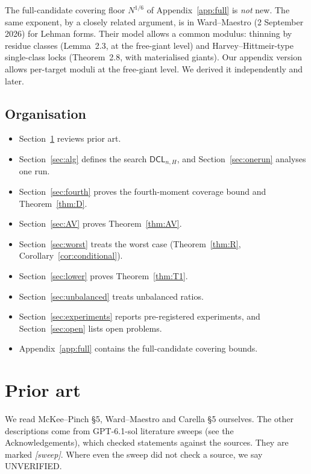 \documentclass[11pt]{amsart}
\theoremstyle{definition}
\newcommand{\DCL}{\textsf{DCL}}
\begin{document}
The full-candidate covering floor $N^{1/6}$ of Appendix~\ref{app:full} is \emph{not} new. The
same exponent, by a closely related argument, is in Ward--Maestro \cite[Thm.~3.6]{wardmaestro2026}
(2 September 2026) for Lehman forms. Their model allows a common modulus: thinning by residue
classes (Lemma~2.3, at the free-giant level) and Harvey--Hittmeir-type single-class locks
(Theorem~2.8, with materialised giants). Our appendix version allows per-target moduli at the
free-giant level. We derived it independently and later.

\subsection{Organisation}
\begin{itemize}
\item Section~\ref{sec:prior} reviews prior art.
\item Section~\ref{sec:alg} defines the search $\DCL_{n,H}$, and Section~\ref{sec:onerun}
  analyses one run.
\item Section~\ref{sec:fourth} proves the fourth-moment coverage bound and
  Theorem~\ref{thm:D}.
\item Section~\ref{sec:AV} proves Theorem~\ref{thm:AV}.
\item Section~\ref{sec:worst} treats the worst case (Theorem~\ref{thm:R},
  Corollary~\ref{cor:conditional}).
\item Section~\ref{sec:lower} proves Theorem~\ref{thm:T1}.
\item Section~\ref{sec:unbalanced} treats unbalanced ratios.
\item Section~\ref{sec:experiments} reports pre-registered experiments, and
  Section~\ref{sec:open} lists open problems.
\item Appendix~\ref{app:full} contains the full-candidate covering bounds.
\end{itemize}

\section{Prior art}\label{sec:prior}

We read McKee--Pinch \S5, Ward--Maestro and Carella \S5 ourselves. The other descriptions
come from GPT-6.1-sol literature sweeps (see the Acknowledgements), which checked statements
against the sources. They are marked \emph{[sweep]}. Where even the sweep did not check a
source, we say UNVERIFIED.
\end{document}
